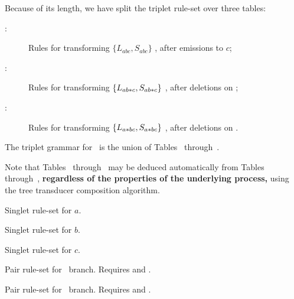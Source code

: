 Because of its length, we have split the triplet rule-set over three tables:
\begin{description}
\item[:] Rules for transforming $\{ L_{abc}, S_{abc}\}$ , after emissions to $c$;
\item[:] Rules for transforming $\{ L_{ab\ast c}, S_{ab\ast c}\}$ , after deletions on \bc;
\item[:] Rules for transforming $\{ L_{a\ast bc}, S_{a\ast bc}\}$ , after deletions on \ab.
\end{description}

The triplet grammar for \abc\ is the union of Tables~ through~.


Note that Tables~ through~ may be deduced automatically from Tables~ through~,
{\bf regardless of the properties of the underlying process,}
using the tree transducer composition algorithm.



\begin{table}
\begin{center}
\caption{ Singlet rule-set for $a$.}
\end{center}
\end{table}
\begin{table}
\begin{center}
\caption{ Singlet rule-set for $b$.}
\end{center}
\end{table}
\begin{table}
\begin{center}
\caption{ Singlet rule-set for $c$.}
\end{center}
\end{table}

\begin{table}
\begin{center}
\caption{ Pair rule-set for \ab\ branch. Requires  and .}
\end{center}
\end{table}


\begin{table}
\begin{center}
\caption{ Pair rule-set for \bc\ branch. Requires  and .}
\end{center}
\end{table}

